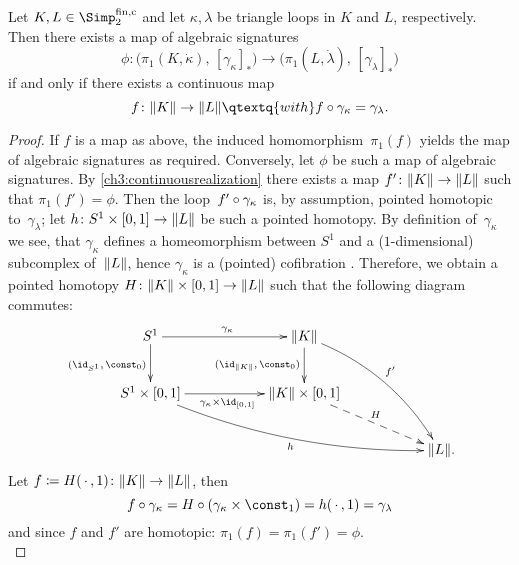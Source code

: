 \begin{thCorollary}
    \label{ch3:algsignvscontinuous}
    Let $K,L\in\finSimp$ and let $\kappa,\lambda$ be triangle loops
    in $K$ and $L$, respectively. Then there exists a map of
    algebraic signatures
    \[ \phi\colon \bigl( \pi_1(K,\dot\kappa), \, [\gamma_\kappa]_\ast \bigr)
        \to \bigl( \pi_1(L,\dot\lambda), \, [\gamma_\lambda]_\ast \bigr)
    \]
    if and only if there exists a continuous map
    \[ f\colon \geom K\to \geom L
        \qtextq{with} f\after\gamma_\kappa = \gamma_\lambda
    . \]
\end{thCorollary}

\begin{proof}
    If $f$ is a map as above, the induced homomorphism~$\pi_1(f)$ yields
    the map of algebraic signatures as required. Conversely, let $\phi$
    be such a map of algebraic signatures. By \cref{ch3:continuousrealization}
    there exists a map $f'\colon\lVert K\rVert\to\lVert L\rVert$ such that $\pi_1(f')=\phi$.
    Then the loop~$f'\after\gamma_\kappa$ is, by assumption, pointed homotopic
    to~$\gamma_\lambda$; let $h\colon S^1\times[0,1]\to\lVert L\rVert$ be such a
    pointed homotopy. By definition of~$\gamma_\kappa$ we see, that
    $\gamma_\kappa$ defines a homeomorphism between $S^1$ and a
    ($1$-dimensional) subcomplex of~$\lVert L\rVert$, hence $\gamma_\kappa$
    is a (pointed) cofibration .
    Therefore, we obtain a pointed homotopy
    $H\colon\lVert K\rVert\times[0,1]\to\lVert L\rVert$ such that the following diagram
    commutes:
    \[
        \xymatrix@C=2cm{
            S^1
                \ar[r]^{\gamma_\kappa}
                \ar[d]_{(\id_{S^1},\,\const_0)}
            & \geom K
                \ar[d]_{(\id_{\geom K},\,\const_0)}
                \ar@/^1pc/[rdd]^{f'}
            \\
            S^1\times[0,1]
                \ar[r]_{\gamma_\kappa\times\id_{[0,1]}}
                \ar@/_1pc/[rrd]_h
            & \geom{K}\times[0,1]
                \ar@{-->}[rd]^H
            \\
            & & \geom L
            \rlap{.}
        }
    \]
    Let $f \coloneqq H(\,\cdot\,,1)\colon \lVert K\rVert\to \lVert L\rVert$, then
    \[ f\after\gamma_\kappa = H \after (\gamma_\kappa\times\const_1)
        = h(\scdot,1) = \gamma_\lambda
    \]
    and since $f$ and $f'$ are homotopic: $\pi_1(f) = \pi_1(f') = \phi$.
    \\
\end{proof}


